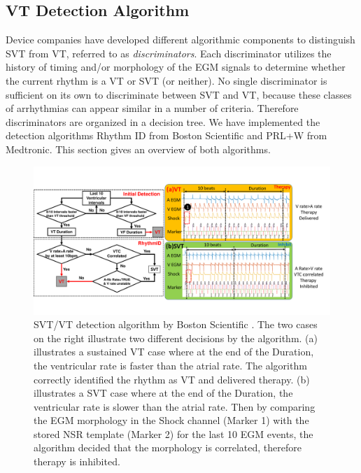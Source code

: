 \subsection{VT Detection Algorithm}
\label{sec:svtvt}
Device companies have developed different algorithmic components to distinguish SVT from VT, referred to as \emph{discriminators}. 
Each discriminator utilizes the history of timing and/or morphology of the EGM signals to determine whether the current rhythm is a VT or SVT (or neither).
No single discriminator is sufficient on its own to discriminate between SVT and VT, because these classes of arrhythmias can appear similar in a number of criteria.
Therefore discriminators are organized in a decision tree.%
We have implemented the detection algorithms Rhythm ID from Boston Scientific and PRL+W from Medtronic. 
This section gives an overview of both algorithms.


\begin{figure}[t]
	\centering
	\includegraphics[scale=0.4]{figs/BS_det.pdf}
	\caption{\small SVT/VT detection algorithm by Boston Scientific \cite{compass}. The two cases on the right illustrate two different decisions by the algorithm. (a) illustrates a sustained VT case where at the end of the Duration, the ventricular rate is faster than the atrial rate. The algorithm correctly identified the rhythm as VT and delivered therapy. (b) illustrates a SVT case where at the end of the Duration, the ventricular rate is slower than the atrial rate. Then by comparing the EGM morphology in the Shock channel (Marker 1) with the stored NSR template (Marker 2) for the last 10 EGM events, the algorithm decided that the morphology is correlated, therefore therapy is inhibited.}
	\label{fig:BS_det}
\end{figure}

